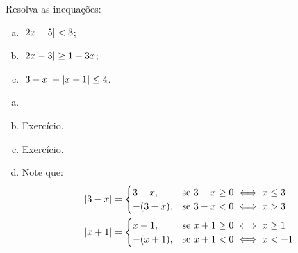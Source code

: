 \begin{example}
Resolva as inequações:
%
\begin{enumerate}[(a)]
  \item $\left|2x-5\right| < 3$;
  \item $\left|2x-3\right| \geq 1-3x$;
  \item $\left|3-x\right| - \left|x+1\right| \leq 4$.
\end{enumerate}
\end{example}

\begin{solution}
\begin{enumerate}[(a)]
	\item[]
	\item Exercício.
	\item Exercício.
	\item Note que:
	\begin{align*}
		& \left|3-x\right|= 
		\begin{cases}
			3-x,    & \text{se } 3-x \ge 0 \iff x \le 3 \\
			-(3-x), & \text{se } 3-x < 0 \iff x > 3
		\end{cases}\\
		& \left|x+1\right|= 
		\begin{cases}
			x+1,    & \text{se } x+1 \ge 0 \iff x \ge 1 \\
			-(x+1), & \text{se } x+1 < 0 \iff x < -1
		\end{cases}
	\end{align*}


\end{enumerate}
\end{solution}
